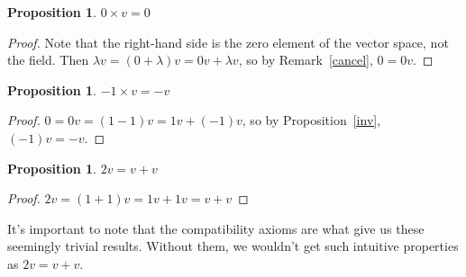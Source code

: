 \documentclass[11pt, reqno]{amsart}
\theoremstyle{definition} %
\newtheorem{proposition}[theorem]{Proposition}
\begin{document}
\begin{proposition}
    $0\times v=0$
    \begin{proof}
        Note that the right-hand side is the zero element of the vector space, not the field. Then $\lambda v=(0+\lambda)v=0v+\lambda v$, so by Remark~\ref{cancel}, $0=0v$.
    \end{proof}
\end{proposition}

\begin{proposition}
    $-1\times v=-v$
    \begin{proof}
        $0=0v=(1-1)v=1v+(-1)v$, so by Proposition~\ref{inv}, $(-1)v=-v$.
    \end{proof}
\end{proposition}

\begin{proposition}
    $2v=v+v$
    \begin{proof}
        $2v=(1+1)v=1v+1v=v+v$
    \end{proof}
\end{proposition}

It's important to note that the compatibility axioms are what give us these seemingly trivial results. Without them, we wouldn't get such intuitive properties as $2v=v+v$.
\end{document}
